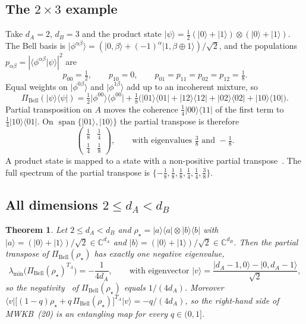 \documentclass[11pt,a4paper]{article}
\newtheorem{theorem}{Theorem}
\theoremstyle{definition}
\theoremstyle{remark}
\newcommand{\ket}[1]{\lvert #1\rangle}
\newcommand{\bra}[1]{\langle #1\rvert}
\newcommand{\ketbra}[2]{\lvert #1\rangle\langle #2\rvert}
\newcommand{\braket}[2]{\langle #1\vert #2\rangle}
\newcommand{\dA}{d_A}
\newcommand{\dB}{d_B}
\newcommand{\PiB}{\Pi_{\mathrm{Bell}}}
\newcommand{\phib}[2]{\phi^{#1#2}}
\DeclareMathOperator{\spn}{span}
\begin{document}
\subsection{The \texorpdfstring{$2\times3$}{2x3} example}

Take $\dA=2$, $\dB=3$ and the product state
$\ket{\psi}=\tfrac12(\ket0+\ket1)\otimes(\ket0+\ket1)$. The Bell basis is
$\ket{\phib{\alpha}{\beta}}=(\ket{0,\beta}+(-1)^{\alpha}\ket{1,\beta\oplus1})/\sqrt2$, and the
populations $p_{\alpha\beta}=|\braket{\phib\alpha\beta}{\psi}|^{2}$ are
\begin{equation}\label{eq:pop23}
p_{00}=\tfrac12,\qquad p_{10}=0,\qquad p_{01}=p_{11}=p_{02}=p_{12}=\tfrac18 .
\end{equation}
Equal weights on $\ket{\phib0\beta}$ and $\ket{\phib1\beta}$ add up to an incoherent
mixture, so
\begin{equation}\label{eq:sigma23}
\PiB(\ketbra\psi\psi)=\tfrac12\ketbra{\phib00}{\phib00}
+\tfrac18\bigl(\ketbra{01}{01}+\ketbra{12}{12}+\ketbra{02}{02}+\ketbra{10}{10}\bigr).
\end{equation}
Partial transposition on $A$ moves the coherence $\tfrac14\ketbra{00}{11}$ of the first
term to $\tfrac14\ketbra{10}{01}$. On $\spn\{\ket{01},\ket{10}\}$ the partial transpose is
therefore
\begin{equation}\label{eq:block23}
\begin{pmatrix}\tfrac18&\tfrac14\\[2pt]\tfrac14&\tfrac18\end{pmatrix},
\qquad\text{with eigenvalues } \tfrac38 \text{ and } -\tfrac18 .
\end{equation}
A product state is mapped to a state with a non-positive partial
transpose~\cite{Peres96,HHH96}. The full spectrum of the partial transpose is
$\{-\tfrac18,\tfrac18,\tfrac18,\tfrac14,\tfrac14,\tfrac38\}$.

\subsection{All dimensions \texorpdfstring{$2\le d_A<d_B$}{2 <= dA < dB}}

\begin{theorem}\label{thm:neg}
Let $2\le\dA<\dB$ and
$\rho_\star=\ketbra{a}{a}\otimes\ketbra{b}{b}$ with
$\ket{a}=(\ket0+\ket1)/\sqrt2\in\mathbb{C}^{\dA}$ and
$\ket{b}=(\ket0+\ket1)/\sqrt2\in\mathbb{C}^{\dB}$. Then the partial transpose of
$\PiB(\rho_\star)$ has exactly one negative eigenvalue,
\begin{equation}\label{eq:lmin}
\lambda_{\min}\bigl(\PiB(\rho_\star)^{T_A}\bigr)=-\frac{1}{4\dA},\qquad
\text{with eigenvector } \ket{v}=\frac{\ket{\dA-1,0}-\ket{0,\dA-1}}{\sqrt2},
\end{equation}
so the negativity~\cite{VW02} of $\PiB(\rho_\star)$ equals $1/(4\dA)$. Moreover
$\bra{v}\bigl[(1-q)\rho_\star+q\,\PiB(\rho_\star)\bigr]^{T_A}\ket{v}=-q/(4\dA)$, so the
right-hand side of MWKB~(20) is an entangling map for every $q\in(0,1]$.
\end{theorem}
\end{document}
